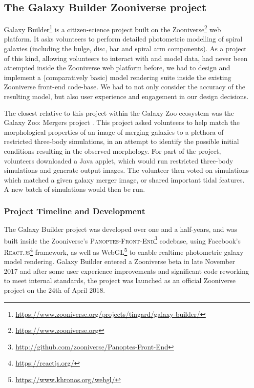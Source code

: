 \documentclass[../main.tex]{subfiles}
\begin{document}
\label{sec:method}

\subsection{The Galaxy Builder Zooniverse project}

Galaxy Builder\footnote{\url{https://www.zooniverse.org/projects/tingard/galaxy-builder/}} is a citizen-science project built on the Zooniverse\footnote{\url{https://www.zooniverse.org}} web platform. It asks volunteers to perform detailed photometric modelling of spiral galaxies (including the bulge, disc, bar and spiral arm components). As a project of this kind, allowing volunteers to interact with and model data, had never been attempted inside the Zooniverse web platform before, we had to design and implement a (comparatively basic) model rendering suite inside the existing Zooniverse front-end code-base. We had to not only consider the accuracy of the resulting model, but also user experience and engagement in our design decisions.

The closest relative to this project within the Galaxy Zoo ecosystem was the Galaxy Zoo: Mergers project \citep{Holincheck2016:1604.00435v1}. This project asked volunteers to help match the morphological properties of an image of merging galaxies to a plethora of restricted three-body simulations, in an attempt to identify the possible initial conditions resulting in the observed morphology. For part of the project, volunteers downloaded a Java applet, which would run restricted three-body simulations and generate output images. The volunteer then voted on simulations which matched a given galaxy merger image, or shared important tidal features. A new batch of simulations would then be run.

\subsubsection{Project Timeline and Development}

The Galaxy Builder project was developed over one and a half-years, and was built inside the Zooniverse's \textsc{Panoptes-Front-End}\footnote{\url{http://github.com/zooniverse/Panoptes-Front-End}} codebase, using Facebook's \textsc{React.js}\footnote{\url{https://reactjs.org/}} framework, as well as WebGL\footnote{\url{https://www.khronos.org/webgl/}} to enable realtime photometric galaxy model rendering. Galaxy Builder entered a Zooniverse beta in late November 2017 and after some user experience improvements and significant code reworking to meet internal standards, the project was launched as an official Zooniverse project on the 24th of April 2018.
\end{document}
